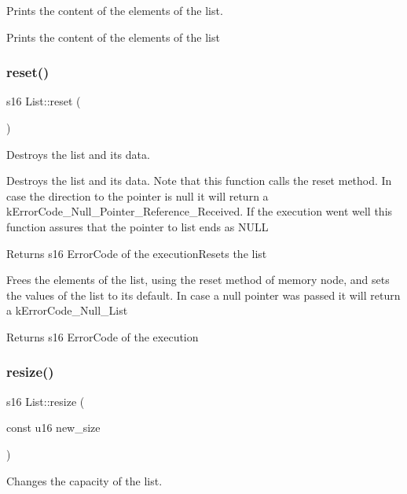 Prints the content of the elements of the list. 

Prints the content of the elements of the list \mbox{\label{class_list_a7702463087250534672ac2042bf814aa}} 
\subsubsection{\texorpdfstring{reset()}{reset()}}
{\footnotesize\ttfamily s16 List\+::reset (\begin{DoxyParamCaption}{ }\end{DoxyParamCaption})}



Destroys the list and it\textquotesingle{}s data. 

Destroys the list and its data. Note that this function calls the reset method. In case the direction to the pointer is null it will return a k\+Error\+Code\+\_\+\+Null\+\_\+\+Pointer\+\_\+\+Reference\+\_\+\+Received. If the execution went well this function assures that the pointer to list ends as N\+U\+LL

\begin{DoxyReturn}{Returns}
s16 Error\+Code of the execution\+Resets the list
\end{DoxyReturn}
Frees the elements of the list, using the reset method of memory node, and sets the values of the list to it\textquotesingle{}s default. In case a null pointer was passed it will return a k\+Error\+Code\+\_\+\+Null\+\_\+\+List

\begin{DoxyReturn}{Returns}
s16 Error\+Code of the execution 
\end{DoxyReturn}
\mbox{\label{class_list_a2998b3c97560a4684d9bbfda30c91ada}} 
\subsubsection{\texorpdfstring{resize()}{resize()}}
{\footnotesize\ttfamily s16 List\+::resize (\begin{DoxyParamCaption}\item[{const u16}]{new\+\_\+size }\end{DoxyParamCaption})}



Changes the capacity of the list. 

